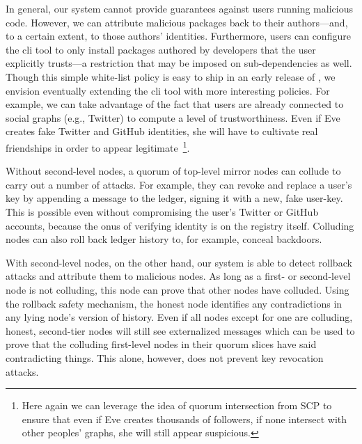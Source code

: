 In general, our system cannot provide guarantees against users running
malicious code. However, we can attribute malicious packages back to their
authors---and, to a certain extent, to those authors' identities. Furthermore,
users can configure the \spam{} cli tool to only install packages authored by
developers that the user explicitly trusts---a restriction that may be imposed
on sub-dependencies as well. Though this simple white-list policy is easy to
ship in an early release of \spam, we envision eventually extending the cli
tool with more interesting policies. For example, we can take advantage of the
fact that \spam users are already connected to social graphs (e.g., Twitter) to
compute a level of trustworthiness. Even if Eve creates fake Twitter and GitHub
identities, she will have to cultivate real friendships in order to appear
legitimate~\footnote{Here again we can leverage the idea of quorum intersection
from SCP to ensure that even if Eve creates thousands of followers, if none
intersect with other peoples' graphs, she will still appear suspicious.}.

Without second-level nodes, a quorum of top-level mirror nodes can collude to
carry out a number of attacks. For example, they can revoke and replace a
user's key by appending a \replaceuserkey message to the ledger, signing it
with a new, fake user-key. This is possible even without compromising the
user's Twitter or GitHub accounts, because the onus of verifying identity is on
the registry itself. Colluding nodes can also roll back ledger history to, for
example, conceal backdoors.

With second-level nodes, on the other hand, our system is able to detect
rollback attacks and attribute them to malicious nodes. As long as a first- or
second-level node is not colluding, this node can prove that other nodes have
colluded. Using the rollback safety mechanism, the honest node identifies any
contradictions in any lying node's version of history. Even if all nodes except
for one are colluding, honest, second-tier nodes will still see externalized
messages which can be used to prove that the colluding first-level nodes in
their quorum slices have said contradicting things. This alone, however, does
not prevent key revocation attacks.

